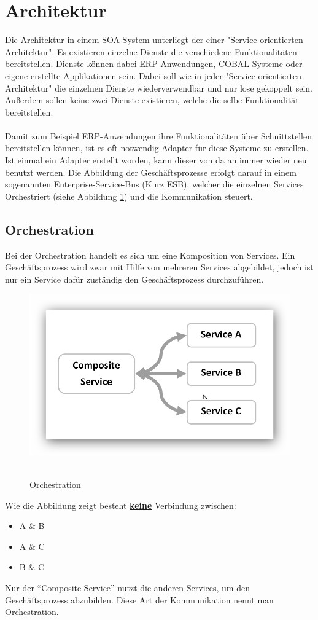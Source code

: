 \section{Architektur}
\label{sec:SoaArchitektur}
Die Architektur in einem SOA-System unterliegt der einer "Service-orientierten Architektur". Es existieren einzelne Dienste die verschiedene Funktionalitäten bereitstellen. Dienste können dabei ERP-Anwendungen, COBAL-Systeme oder eigene erstellte Applikationen sein. Dabei soll wie in jeder "Service-orientierten Architektur" die einzelnen Dienste wiederverwendbar und nur lose gekoppelt sein. Außerdem sollen keine zwei Dienste existieren, welche die selbe Funktionalität bereitstellen.
\\\\
Damit zum Beispiel ERP-Anwendungen ihre Funktionalitäten über Schnittstellen bereitstellen können, ist es oft notwendig Adapter für diese Systeme zu erstellen. Ist einmal ein Adapter erstellt worden, kann dieser von da an immer wieder neu benutzt werden. Die Abbildung der Geschäftsprozesse erfolgt darauf in einem sogenannten Enterprise-Service-Bus (Kurz ESB), welcher die einzelnen Services Orchestriert (siehe Abbildung \ref{fig:ServiceOrchestration}) und die Kommunikation steuert.

\subsection{Orchestration}
\label{subsec:orchestration}
Bei der Orchestration handelt es sich um eine Komposition von Services. Ein Geschäftsprozess wird zwar mit Hilfe von mehreren Services abgebildet, jedoch ist nur ein Service dafür zuständig den Geschäftsprozess durchzuführen.
\newpage
\begin{figure}[htb]
    \centering 
    \includegraphics[width=\linewidth]{content/images/ServiceOrchestration}\
    \caption[Orchestration]{Orchestration}
    \label{fig:ServiceOrchestration}  
\end{figure}
\noindent
Wie die Abbildung zeigt besteht \textbf{\underline{keine}} Verbindung zwischen:
\begin{itemize}
    \item A \& B
    \item A \& C
    \item B \& C
\end{itemize}
Nur der "`Composite Service"' nutzt die anderen Services, um den Geschäftsprozess abzubilden. Diese Art der Kommunikation nennt man Orchestration.

